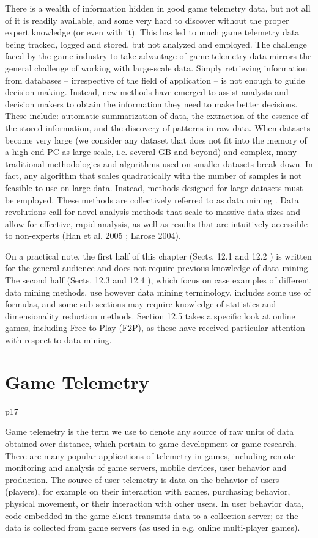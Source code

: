 There is a wealth of information hidden in good game telemetry data, but not all of it is readily available, and some very hard to discover without the proper expert knowledge (or even with it). This has led to much game telemetry data being tracked, logged and stored, but not analyzed and employed. The challenge faced by the game industry to take advantage of game telemetry data mirrors the general challenge of working with large-scale data. Simply retrieving information from databases – irrespective of the field of application – is not enough to guide decision-making. Instead, new methods have emerged to assist analysts and decision makers to obtain the information they need to make better decisions. These include: automatic summarization of data, the extraction of the essence of the stored information, and the discovery of patterns in raw data. When datasets become very large (we consider any dataset that does not fit into the memory of a high-end PC as large-scale, i.e. several
GB and beyond) and complex, many traditional methodologies and algorithms used on smaller datasets break down. In fact, any algorithm that scales quadratically with the number of samples is not feasible to use on large data. Instead, methods designed for large datasets must be employed. These methods are collectively referred to as data mining . Data revolutions call for novel analysis methods that scale to massive data sizes and allow for effective, rapid analysis, as well as results that are intuitively accessible to non-experts (Han et al. 2005 ; Larose 2004).

On a practical note, the first half of this chapter (Sects. 12.1 and 12.2 ) is written for the general audience and does not require previous knowledge of data mining. The second half (Sects. 12.3 and 12.4 ), which focus on case examples of different data mining methods, use however data mining terminology, includes some use of formulas, and some sub-sections may require knowledge of statistics and dimensionality reduction methods. Section 12.5 takes a specific look at online games, including Free-to-Play (F2P), as these have received particular attention with respect to data mining.

\section{Game Telemetry}

p17

Game telemetry is the term we use to denote any source of raw units of data obtained over distance, which pertain to game development or game research. There are many popular applications of telemetry in games, including remote monitoring and analysis of game servers, mobile devices, user behavior and production. The source of user telemetry is data on the behavior of users (players), for example on their interaction with games, purchasing behavior, physical movement, or their interaction with other users. In user behavior data, code embedded in the game client transmits data to a collection server; or the data is collected from game servers (as used in e.g. online multi-player games).

